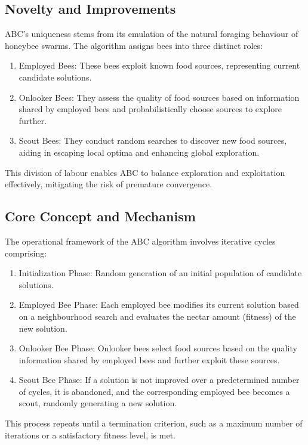 \documentclass[a4paper, 12pt]{extarticle}
\begin{document}
\subsection{Novelty and Improvements}
ABC's uniqueness stems from its emulation of the natural foraging behaviour of honeybee swarms. The algorithm assigns bees into three distinct roles:\cite{karaboga2007powerful}\cite{karaboga2007artificial}
\begin{enumerate}
    \item Employed Bees: These bees exploit known food sources, representing current candidate solutions.
    \item Onlooker Bees: They assess the quality of food sources based on information shared by employed bees and probabilistically choose sources to explore further.
    \item Scout Bees: They conduct random searches to discover new food sources, aiding in escaping local optima and enhancing global exploration. 
\end{enumerate}

This division of labour enables ABC to balance exploration and exploitation effectively, mitigating the risk of premature convergence.

\subsection{Core Concept and Mechanism}

The operational framework of the ABC algorithm involves iterative cycles comprising:
\begin{enumerate}
    \item Initialization Phase: Random generation of an initial population of candidate solutions.
    \item Employed Bee Phase: Each employed bee modifies its current solution based on a neighbourhood search and evaluates the nectar amount (fitness) of the new solution.
    \item Onlooker Bee Phase: Onlooker bees select food sources based on the quality information shared by employed bees and further exploit these sources.
    \item Scout Bee Phase: If a solution is not improved over a predetermined number of cycles, it is abandoned, and the corresponding employed bee becomes a scout, randomly generating a new solution.
\end{enumerate}

This process repeats until a termination criterion, such as a maximum number of iterations or a satisfactory fitness level, is met.\cite{karaboga2007artificial}
\end{document}
